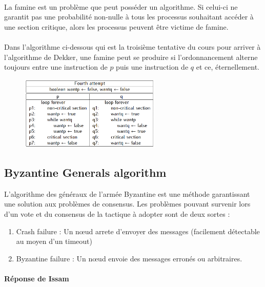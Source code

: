 \paragraph{}
La famine est un problème que peut posséder un algorithme. Si celui-ci ne garantit pas une probabilité non-nulle à tous les processus souhaitant accéder à une section critique, alors les processus peuvent être victime de famine.
\paragraph{}
Dans l'algorithme ci-dessous qui est la troisième tentative du cours pour arriver à l'algorithme de Dekker, une famine peut se produire si l'ordonnancement alterne toujours entre une instruction de $p$ puis une instruction de $q$ et ce, éternellement. 
\begin{figure}[H]
	\centering
    \includegraphics[width=0.6\textwidth]{img_4_4__0}
\end{figure}

\subsection{Byzantine Generals algorithm}
L'algorithme des généraux de l'armée Byzantine est une méthode garantissant une solution aux problèmes de consensus. Les problèmes pouvant survenir lors d'un vote et du consensus de la tactique à adopter sont de deux sortes :
\begin{enumerate}
\item Crash failure : Un nœud arrete d’envoyer des messages (facilement détectable au moyen d'un timeout)
\item Byzantine failure : Un nœud envoie des messages erronés ou arbitraires.
\end{enumerate}

\paragraph{Réponse de Issam}












